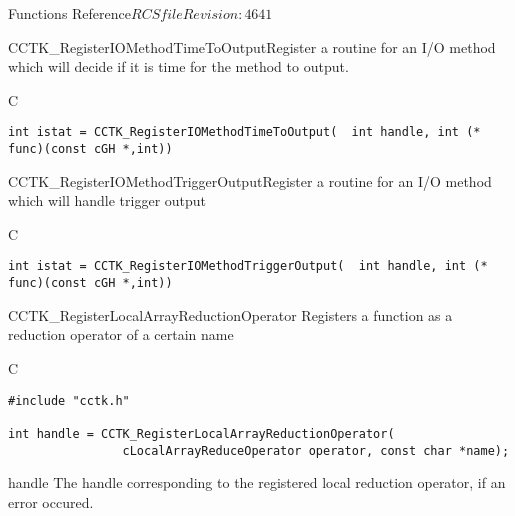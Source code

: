 \begin{cactuspart}{ Functions Reference}{$RCSfile$}{$Revision: 4641 $}
\begin{FunctionDescription}{CCTK\_RegisterIOMethodTimeToOutput}{Register a routine for an I/O method which will decide if it is time for the method to output.}
\label{CCTK-RegisterIOMethodTimeToOutput}
\begin{SynopsisSection}
\begin{Synopsis}{C}
\begin{verbatim}int istat = CCTK_RegisterIOMethodTimeToOutput(  int handle, int (* func)(const cGH *,int))\end{verbatim}
\end{Synopsis}
\end{SynopsisSection}
\end{FunctionDescription}

\begin{FunctionDescription}{CCTK\_RegisterIOMethodTriggerOutput}{Register a routine for an I/O method which will handle trigger output}
\label{CCTK-RegisterIOMethodTriggerOutput}
\begin{SynopsisSection}
\begin{Synopsis}{C}
\begin{verbatim}int istat = CCTK_RegisterIOMethodTriggerOutput(  int handle, int (* func)(const cGH *,int))\end{verbatim}
\end{Synopsis}
\end{SynopsisSection}
\end{FunctionDescription}

\begin{FunctionDescription}{CCTK\_RegisterLocalArrayReductionOperator}
\label{CCTK-RegisterLocalArrayReductionOperator}
Registers a function as a reduction operator of a certain name

\begin{SynopsisSection}
\begin{Synopsis}{C}
\begin{verbatim}
#include "cctk.h"

int handle = CCTK_RegisterLocalArrayReductionOperator(
                cLocalArrayReduceOperator operator, const char *name);
\end{verbatim}
\end{Synopsis}
\end{SynopsisSection}

\begin{ResultSection}
\begin{Result}{handle}
The handle corresponding to the registered local reduction operator, 
if an error occured.
\end{Result}
\end{ResultSection}


\end{FunctionDescription}
\end{cactuspart}
